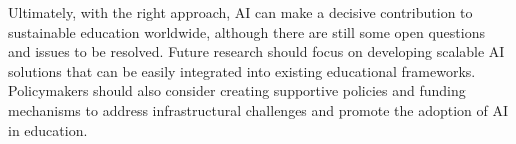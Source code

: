 \documentclass[]{lni}
\begin{document}
Ultimately, with the right approach, AI can make a decisive contribution to sustainable education worldwide, although there are still some open questions and issues to be resolved. 
Future research should focus on developing scalable AI solutions that can be easily integrated into existing educational frameworks. Policymakers should also consider creating supportive 
policies and funding mechanisms to address infrastructural challenges and promote the adoption of AI in education. 

\newpage 



\printbibliography %
\end{document}
